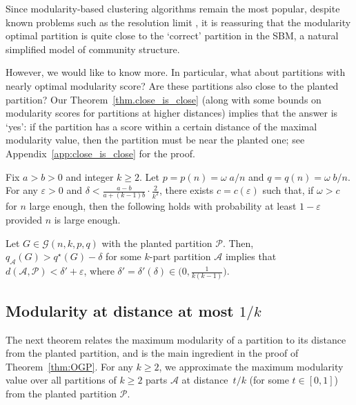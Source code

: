 \documentclass[a4paper,UKenglish,cleveref, autoref, thm-restate,numberwithinsect]{lipics-v2021}
\newcommand{\cA}{\mathcal{A}}
\newcommand{\cP}{\mathcal{P}}
\newcommand{\q}{q^{\star}}
\newcommand{\eps}{\varepsilon}
\begin{document}
Since modularity-based clustering algorithms remain the most popular, despite known problems such as the resolution limit \cite{fortunato2007resolution}, it is reassuring that the modularity optimal partition is quite close to the `correct' partition in the SBM, a natural simplified model of community structure.  

However, we would like to know more. In particular, what about partitions with nearly optimal modularity score? Are these partitions also close to the planted partition? Our Theorem~\ref{thm.close_is_close} (along with some bounds on modularity scores for partitions at higher distances) implies that the answer is `yes': if the partition has a score within a certain distance of the maximal modularity value, then the partition must be near the planted one; see Appendix~\ref{app:close_is_close} for the proof.


\begin{theorem}    
\label{thm.close_is_close} 
Fix $a>b>0$ and integer $k\ge 2$. Let $p=p(n)=\omega\; a / n$ and $q=q(n)=\omega \; b/n$. For any $\eps>0$ and $\delta<\frac{a-b}{a+(k-1)b} \cdot \frac{2}{k^2}$, there exists $c=c(\eps)$ such that, if $\omega>c$ for $n$ large enough, then the following holds with probability at least $1-\eps$ provided $n$ is large enough. 

Let $G \in \mathcal{G}(n,k,p,q)$ with the planted partition $\cP$. 
Then, $q_\cA(G)>\q(G) - \delta $ for some $k$-part partition $\cA$ implies that $d(\cA, \cP) < \delta' + \varepsilon$,
where $\delta' =\delta'(\delta) \in \big(0,\frac{1}{k(k-1)}\big)$.
\end{theorem}


\subsection{Modularity at distance at most $1/k$}


The next theorem relates the maximum modularity of a partition to its distance from the planted partition, and is the main ingredient in the proof of Theorem~\ref{thm:OGP}.
For any $k \ge 2$, we approximate the maximum modularity value over all partitions of $k\ge 2$ parts $\cA$ at distance~$t/k$ (for some $t \in [0,1]$) from the planted partition $\cP$.
\end{document}
